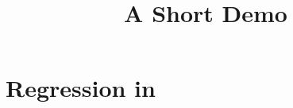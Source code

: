 \documentclass[article]{jss}
\title{A Short Demo}
\begin{document}
\section{Regression in }
\end{document}
